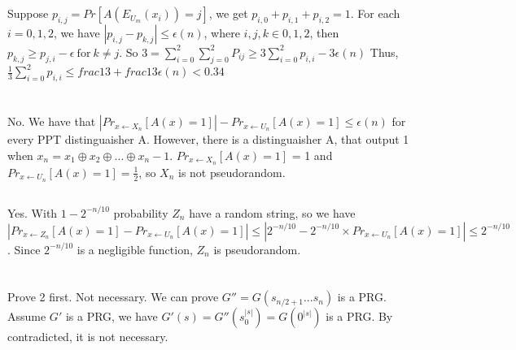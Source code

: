 \documentclass[onecolumn,oneside]{SUSTechHomework}
\begin{document}
  \section{}

  Suppose $p_{i,j} = Pr[A(E_{U_m}(x_i))=j]$, we get $p_{i,0}+p_{i,1}+p_{i,2}=1$. For each $i = 0,1,2$, we have $|p_{i,j}-p_{k,j}| \le \epsilon(n)$, where $i,j,k \in {0,1,2}$, then $p_{k,j} \ge p_{j,i} - \epsilon~\mbox{for}~k \neq j$.
  So $3 = \sum_{i=0}^{2}\sum_{j=0}^{2}P_{ij} \ge 3\sum_{i=0}^{2}p_{i,i}-3\epsilon (n)$
  Thus, $\frac{1}{3}\sum_{i=0}^{2}p_{i,i} \le frac{1}{3}+frac{1}{3}\epsilon (n) < 0.34$

  \section{}

    \subsection{} No. We have that $|Pr_{x \leftarrow X_n}[A(x)=1]| - Pr_{x \leftarrow U_n}[A(x)=1] \le \epsilon (n)$  for every PPT distinguaisher A.
    However, there is a distinguaisher A, that output 1 when $x_n = x_1 \oplus x_2 \oplus ... \oplus x_n-1$. $Pr_{x \leftarrow X_n}[A(x)=1]$ = 1 and $Pr_{x \leftarrow U_n}[A(x)=1] = \frac{1}{2}$, so $X_n$ is not pseudorandom.

    \subsection{} Yes. With $1-2^{-n/10}$ probability $Z_n$ have a random string, so we have $|Pr_{x \leftarrow Z_n}[A(x)=1] - Pr_{x \leftarrow U_n}[A(x)=1]| \le |2^{-n/10} - 2^{-n/10} \times Pr_{x \leftarrow U_n}[A(x)=1]| \le 2^{-n/10}$. Since $2^{-n/10}$ is a negligible function, $Z_n$ is pseudorandom.

  \section{}

    \subsection{}

    Prove 2 first.
    Not necessary. We can prove $G'' = G(s_{n/2+1}...s_n)$ is a PRG. Assume $G'$ is a PRG, we have $G'(s) = G''(s_0^{|s|})=G(0^{|s|})$ is a PRG. By contradicted, it is not necessary.
\end{document}
